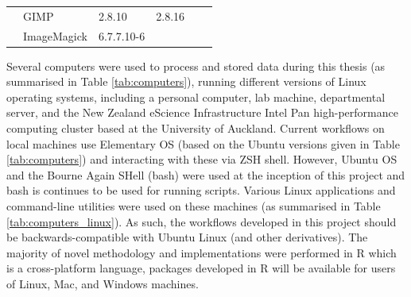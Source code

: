 \begin{table}[!ht]
{\begin{tabular}{ll|l|l|l|l|}
\multicolumn{1}{|l}{}                                  & \multicolumn{1}{|l|}{GIMP}                   & 2.8.10                                                              & 2.8.16                                                            &                                                                        &                                                             \\ \cline{2-6}
\multicolumn{1}{|l}{}                                  & \multicolumn{1}{|l|}{ImageMagick}            & 6.7.7.10-6                                                          &                                                                   &                                                                        &                                                             \\ \hline
                                  
\end{tabular}
}
\end{table}

Several computers were used to process and stored data during this thesis (as summarised in Table \ref{tab:computers}), running different versions of Linux operating systems, including a personal computer, lab machine, departmental server, and the New Zealand eScience Infrastructure Intel Pan high-performance computing cluster based at the University of Auckland. Current workflows on local machines use Elementary OS (based on the Ubuntu versions given in Table \ref{tab:computers}) and interacting with these via ZSH shell. However, Ubuntu OS and the Bourne Again SHell (bash) were used at the inception of this project and bash is continues to be used for running scripts. Various Linux applications and command-line utilities were used on these machines (as summarised in Table \ref{tab:computers_linux}). As such, the workflows developed in this project should be backwards-compatible with Ubuntu Linux (and other derivatives). The majority of novel methodology and implementations were performed in R which is a cross-platform language, packages developed in R will be available for users of Linux, Mac, and Windows machines.  


